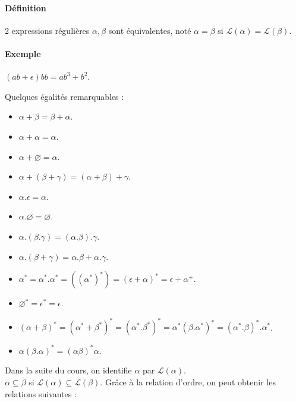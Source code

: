 \paragraph{Définition} %
\label{par:d_finition}

2 expressions régulières $\alpha, \beta$ sont équivalentes, noté $\alpha = \beta$ si $\mathcal{L}(\alpha)=\mathcal{L}(\beta)$.



\paragraph{Exemple} %
\label{par:exemple}

$(ab + \epsilon)bb=ab^3+b^2$.



Quelques égalités remarquables :

\begin{itemize}
	\item $\alpha + \beta = \beta + \alpha$.
	\item $\alpha + \alpha = \alpha$.
	\item $\alpha + \varnothing = \alpha$.
	\item $\alpha + (\beta + \gamma) = (\alpha + \beta) + \gamma$.
	\item $\alpha . \epsilon = \alpha$.
	\item $\alpha . \varnothing = \varnothing$.
	\item $\alpha . (\beta . \gamma) = (\alpha . \beta) . \gamma$.
	\item $\alpha . (\beta + \gamma) = \alpha . \beta + \alpha . \gamma$.
	\item $\alpha^* = \alpha^* . \alpha^* = ((\alpha^*)^*) = (\epsilon + \alpha)^* = \epsilon + \alpha^+$.
	\item $\varnothing^* = \epsilon^* = \epsilon$.
	\item $(\alpha + \beta)^* = (\alpha^* + \beta^*)^* = (\alpha^* . \beta^*)^* = \alpha^*(\beta . \alpha^*)^* = (\alpha^* . \beta)^* . \alpha^*$.
	\item $\alpha(\beta.\alpha)^* = (\alpha\beta)^*\alpha$.
\end{itemize}


Dans la suite du cours, on identifie $\alpha$ par $\mathcal{L}(\alpha)$.\\
$\alpha \subseteq \beta$ si $\mathcal{L}(\alpha) \subseteq \mathcal{L}(\beta)$. Grâce à la relation d'ordre, on peut obtenir les relations suivantes :


